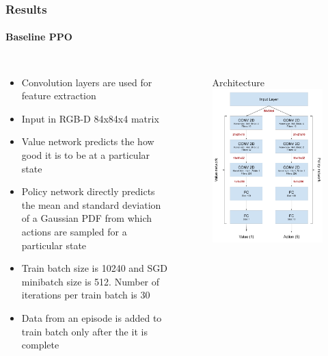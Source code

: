 \documentclass{beamer}
\begin{document}
	\begin{frame}
		\frametitle{Results}
		\framesubtitle{Baseline PPO}
		\begin{columns}[c]
			\begin{itemize}
				\item Convolution layers are used for feature extraction
				\item Input in RGB-D 84x84x4 matrix
				\item Value network predicts the how good it is to be at a particular state
				\item Policy network directly predicts the mean and standard deviation of a Gaussian PDF from which actions are sampled for a particular state
				\item Train batch size is 10240 and SGD minibatch size is 512. Number of iterations per train batch is 30
				\item Data from an episode is added to train batch only after the it is complete
			\end{itemize}
			
			\begin{figure}
				\small{Architecture}
				\includegraphics[scale=0.25]{visionnet-arch.png}
			\end{figure}
		\end{columns}
	\end{frame}
\end{document}
